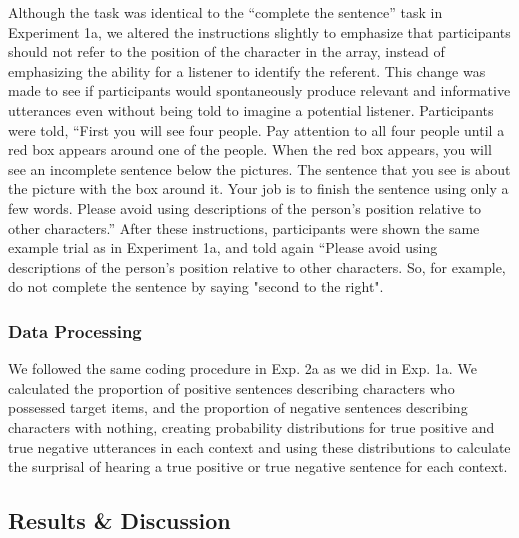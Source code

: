 \documentclass[man, floatsintext, noapacite]{apa6}
\begin{document}
Although the task was identical to the ``complete the sentence'' task in Experiment 1a, we altered the instructions slightly to emphasize that participants should not refer to the position of the character in the array, instead of emphasizing the ability for a listener to identify the referent. This change was made to see if participants would spontaneously produce relevant and informative utterances even without being told to imagine a potential listener. Participants were told, ``First you will see four people. Pay attention to all four people until a red box appears around one of the people. When the red box appears, you will see an incomplete sentence below the pictures. The sentence that you see is about the picture with the box around it. Your job is to finish the sentence using only a few words. Please avoid using descriptions of the person's position relative to other characters.'' After these instructions, participants were shown the same example trial as in Experiment 1a, and told again ``Please avoid using descriptions of the person's position relative to other characters. So, for example, do not complete the sentence by saying "second to the right".

\subsubsection{Data Processing} 

We followed the same coding procedure in Exp. 2a as we did in Exp. 1a. We calculated the proportion of positive sentences describing characters who possessed target items, and the proportion of negative sentences describing characters with nothing, creating probability distributions for true positive and true negative utterances in each context and using these distributions to calculate the surprisal of hearing a true positive or true negative sentence for each context. 


\subsection{Results \& Discussion}
\end{document}
